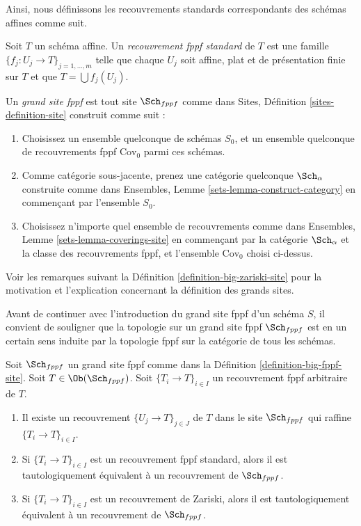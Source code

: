 \noindent
Ainsi, nous définissons les recouvrements standards correspondants des schémas affines comme suit.

\begin{definition}
\label{definition-standard-fppf}
Soit $T$ un schéma affine. Un {\it recouvrement fppf standard} de $T$ est une famille $\{f_j : U_j \to T\}_{j = 1, \ldots, m}$ telle que chaque $U_j$ soit affine, plat et de présentation finie sur $T$ et que $T = \bigcup f_j(U_j)$.
\end{definition}

\begin{definition}
\label{definition-big-fppf-site}
Un {\it grand site fppf} est tout site $\Sch_{fppf}$ comme dans Sites, Définition \ref{sites-definition-site} construit comme suit :
\begin{enumerate}
\item Choisissez un ensemble quelconque de schémas $S_0$, et un ensemble quelconque de recouvrements fppf $\text{Cov}_0$ parmi ces schémas.
\item Comme catégorie sous-jacente, prenez une catégorie quelconque $\Sch_\alpha$\newline construite comme dans Ensembles, Lemme \ref{sets-lemma-construct-category} en commençant par l'ensemble $S_0$.
\item Choisissez n'importe quel ensemble de recouvrements comme dans Ensembles, Lemme \ref{sets-lemma-coverings-site} en commençant par la catégorie $\Sch_\alpha$ et la classe des recouvrements fppf, et l'ensemble $\text{Cov}_0$ choisi ci-dessus.
\end{enumerate}
\end{definition}

\noindent
Voir les remarques suivant la Définition \ref{definition-big-zariski-site} pour la motivation et l'explication concernant la définition des grands sites.

\medskip\noindent
Avant de continuer avec l'introduction du grand site fppf d'un schéma $S$, il convient de souligner que la topologie sur un grand site fppf $\Sch_{fppf}$ est en un certain sens induite par la topologie fppf sur la catégorie de tous les schémas.

\begin{lemma}
\label{lemma-fppf-induced}
Soit $\Sch_{fppf}$ un grand site fppf comme dans la Définition \ref{definition-big-fppf-site}. Soit $T \in \Ob(\Sch_{fppf})$. Soit $\{T_i \to T\}_{i \in I}$ un recouvrement fppf arbitraire de $T$.
\begin{enumerate}
\item Il existe un recouvrement $\{U_j \to T\}_{j \in J}$ de $T$ dans le site $\Sch_{fppf}$ qui raffine $\{T_i \to T\}_{i \in I}$.
\item Si $\{T_i \to T\}_{i \in I}$ est un recouvrement fppf standard, alors il est tautologiquement équivalent à un recouvrement de $\Sch_{fppf}$.
\item Si $\{T_i \to T\}_{i \in I}$ est un recouvrement de Zariski, alors il est tautologiquement équivalent à un recouvrement de $\Sch_{fppf}$.
\end{enumerate}
\end{lemma}

